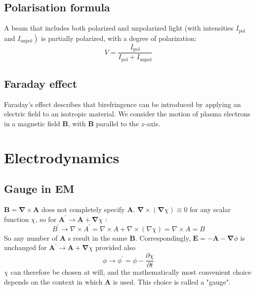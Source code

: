 \documentclass[12pt,a4paper]{article}
\begin{document}
\subsection{Polarisation formula}
A beam that includes both polarized and unpolarized light (with intensities $I_{\mathrm{pol}}$ and $\left. I_{\mathrm{unpol}}\right)$ is partially polarized, with a degree of polarization:
$$
V=\frac{I_{\mathrm{pol}}}{I_{\mathrm{pol}}+I_{\mathrm{unpol}}}
$$
\subsection{Faraday effect}
Faraday's effect describes that birefringence can be introduced by applying an electric field to an isotropic material.
We consider the motion of plasma electrons in a magnetic field $\boldsymbol{B}$, with $\boldsymbol{B}$ parallel to the $z$-axis.
\section{Electrodynamics}
\subsection{Gauge in EM}
$\boldsymbol{B}=\boldsymbol{\nabla} \times \boldsymbol{A}$ does not completely specify $\boldsymbol{A}$.
$\boldsymbol{\nabla} \times(\boldsymbol{\nabla} \chi) \equiv 0$ for any scalar function $\chi$, so for $\boldsymbol{A}^{\prime} \rightarrow \boldsymbol{A}+\boldsymbol{\nabla} \chi$ :
$$
B^{\prime} \rightarrow \nabla \times A^{\prime}=\nabla \times A+\nabla \times(\nabla \chi)=\nabla \times A=B
$$
So any number of $\boldsymbol{A}$ s result in the same $\boldsymbol{B}$.
Correspondingly, $\boldsymbol{E}=-\dot{\boldsymbol{A}}-\boldsymbol{\nabla} \phi$ is unchanged for $\boldsymbol{A}^{\prime} \rightarrow \boldsymbol{A}+\boldsymbol{\nabla} \chi$ provided also
$$
\phi \rightarrow \phi^{\prime}=\phi-\frac{\partial \chi}{\partial t}
$$
$\chi$ can therefore be chosen at will, and the mathematically most convenient choice depends on the context in which $\boldsymbol{A}$ is used.
This choice is called a "gauge".
\end{document}
